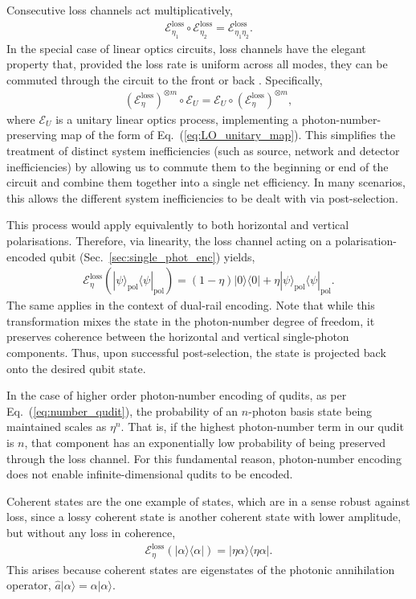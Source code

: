 \documentclass[aps,rmp,twocolumn,amsmath,amssymb,nofootinbib,superscriptaddress,longbibliography,floatfix,table-of-contents,eqsecnum]{revtex4-1}
\newcommand{\bra}[1]{\langle#1|}
\newcommand{\ket}[1]{|#1\rangle}
\begin{document}
Consecutive loss channels act multiplicatively,
\begin{align}
\mathcal{E}_{\eta_1}^\text{loss} \circ \mathcal{E}_{\eta_2}^\text{loss} = \mathcal{E}_{\eta_1 \eta_2}^\text{loss}.
\end{align}
In the special case of linear optics circuits, loss channels have the elegant property that, provided the loss rate is uniform across all modes, they can be commuted through the circuit to the front or back \cite{???}. Specifically,
\begin{align}
(\mathcal{E}_{\eta}^\text{loss})^{\otimes m} \circ \mathcal{E}_U = \mathcal{E}_U \circ (\mathcal{E}_{\eta}^\text{loss})^{\otimes m},
\end{align}
where $\mathcal{E}_U$ is a unitary linear optics process, implementing a photon-number-preserving map of the form of Eq.~(\ref{eq:LO_unitary_map}). This simplifies the treatment of distinct system inefficiencies (such as source, network and detector inefficiencies) by allowing us to commute them to the beginning or end of the circuit and combine them together into a single net efficiency. In many scenarios, this allows the different system inefficiencies to be dealt with via post-selection.

This process would apply equivalently to both horizontal and vertical polarisations. Therefore, via linearity, the loss channel acting on a polarisation-encoded qubit (Sec.~\ref{sec:single_phot_enc}) yields,
\begin{align}
\mathcal{E}^\text{loss}_\eta(\ket\psi_\text{pol}\bra\psi_\text{pol}) = (1-\eta) \ket{0}\bra{0} + \eta\ket\psi_\text{pol}\bra\psi_\text{pol}.
\end{align}
The same applies in the context of dual-rail encoding. Note that while this transformation mixes the state in the photon-number degree of freedom, it preserves coherence between the horizontal and vertical single-photon components. Thus, upon successful post-selection, the state is projected back onto the desired qubit state.

In the case of higher order photon-number encoding of qudits, as per Eq.~(\ref{eq:number_qudit}), the probability of an $n$-photon basis state being maintained scales as $\eta^n$. That is, if the highest photon-number term in our qudit is $n$, that component has an exponentially low probability of being preserved through the loss channel. For this fundamental reason, photon-number encoding does not enable infinite-dimensional qudits to be encoded.

Coherent states are the one example of states, which are in a sense robust against loss, since a lossy coherent state is another coherent state with lower amplitude, but without any loss in coherence,
\begin{align}
\mathcal{E}^\text{loss}_\eta(\ket\alpha\bra\alpha) = \ket{\eta\alpha}\bra{\eta\alpha}.
\end{align}
This arises because coherent states are eigenstates of the photonic annihilation operator, \mbox{$\hat{a}\ket{\alpha}=\alpha\ket{\alpha}$}.
\end{document}
